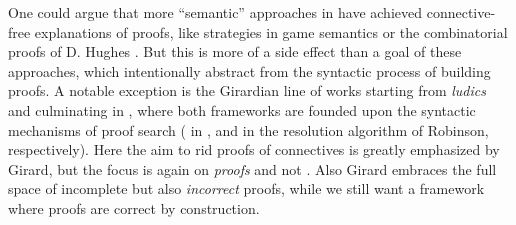 \begin{scope}
\begin{scope}
\begin{description}
    \begin{digression}
    One could argue that more ``semantic'' approaches in  have
    achieved connective-free explanations of proofs, like strategies in game
    semantics or the combinatorial proofs of D. Hughes
    \cite{heijltjes_intuitionistic_2019}. But this is more of a side effect than
    a goal of these approaches, which intentionally abstract from the syntactic
    process of building proofs. A notable exception is the Girardian line of
    works starting from \emph{ludics} \cite{girard_locus_2001} and culminating
    in  \cite{eng_exegesis_2023}, where both
    frameworks are founded upon the syntactic mechanisms of proof search
    ( in , and  in the
    resolution algorithm of Robinson, respectively). Here the aim to rid proofs
    of connectives is greatly emphasized by Girard, but the focus is again on
    \emph{proofs} and not \emph{}. Also Girard embraces the
    full space of incomplete but also \emph{incorrect} proofs, while we still
    want a framework where proofs are correct by construction.
    \end{digression}


\end{description}
\end{scope}
\end{scope}
